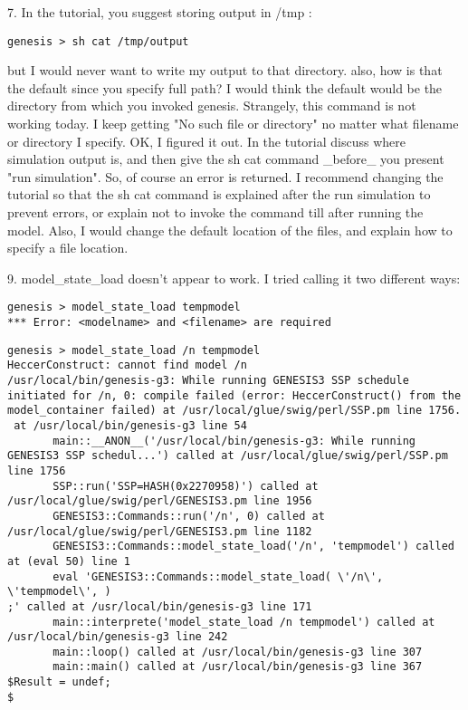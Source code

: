 \documentclass[12pt]{article}
\begin{document}
7. In the tutorial, you suggest storing output in /tmp :
\begin{verbatim}
genesis > sh cat /tmp/output
\end{verbatim}
but I would never want to write my output to that directory.  also,
how is that the default since you specify full path?  I would think
the default would be the directory from which you invoked genesis.
Strangely, this command is not working today.  I keep getting "No such
file or directory" no matter what filename or directory I specify.
OK, I figured it out.  In the tutorial discuss where simulation output
is, and then give the sh cat command \_before\_ you present "run
simulation".  So, of course an error is returned.  I recommend
changing the tutorial so that the sh cat command is explained after
the run simulation to prevent errors, or explain not to invoke the
command till after running the model.  Also, I would change the
default location of the files, and explain how to specify a file
location.

9. model\_state\_load doesn't appear to work.  I tried calling it two
different ways:
\begin{verbatim}
genesis > model_state_load tempmodel
*** Error: <modelname> and <filename> are required
\end{verbatim}
\begin{verbatim}
genesis > model_state_load /n tempmodel
HeccerConstruct: cannot find model /n
/usr/local/bin/genesis-g3: While running GENESIS3 SSP schedule initiated for /n, 0: compile failed (error: HeccerConstruct() from the model_container failed) at /usr/local/glue/swig/perl/SSP.pm line 1756.
 at /usr/local/bin/genesis-g3 line 54
       main::__ANON__('/usr/local/bin/genesis-g3: While running GENESIS3 SSP schedul...') called at /usr/local/glue/swig/perl/SSP.pm line 1756
       SSP::run('SSP=HASH(0x2270958)') called at /usr/local/glue/swig/perl/GENESIS3.pm line 1956
       GENESIS3::Commands::run('/n', 0) called at /usr/local/glue/swig/perl/GENESIS3.pm line 1182
       GENESIS3::Commands::model_state_load('/n', 'tempmodel') called at (eval 50) line 1
       eval 'GENESIS3::Commands::model_state_load( \'/n\', \'tempmodel\', )
;' called at /usr/local/bin/genesis-g3 line 171
       main::interprete('model_state_load /n tempmodel') called at /usr/local/bin/genesis-g3 line 242
       main::loop() called at /usr/local/bin/genesis-g3 line 307
       main::main() called at /usr/local/bin/genesis-g3 line 367
$Result = undef;
$
\end{verbatim}
\end{document}
